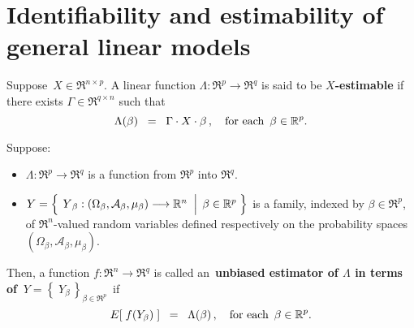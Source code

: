 

\section{Identifiability and estimability of general linear models}
\setcounter{theorem}{0}
\setcounter{equation}{0}

\renewcommand{\theenumi}{\roman{enumi}}
\renewcommand{\labelenumi}{\textnormal{(\theenumi)}$\;\;$}


\begin{definition}
\mbox{}\vskip 0.1cm\noindent
Suppose \,$X \in \Re^{n \times p}$.
A linear function $\Lambda : \Re^{p} \longrightarrow \Re^{q}$ is said to be \textbf{$X$-estimable}
if there exists $\Gamma \in \Re^{q \times n}$ such that
\begin{equation*}
\Lambda(\beta) \;\; =\;\; \Gamma \cdot X \cdot \beta\,,
\quad
\textnormal{for each \,$\beta \in \Re^{p}$}.
\end{equation*}
\end{definition}

\begin{definition}
\mbox{}\vskip 0.1cm\noindent
Suppose:
\begin{itemize}
\item
	$\Lambda : \Re^{p} \longrightarrow \Re^{q}$ is a function from $\Re^{p}$ into $\Re^{q}$.
\item
	$Y = \left\{\;
		\left.
		\overset{{\color{white}.}}{Y}_{\beta} : (\Omega_{\beta},\mathcal{A}_{\beta},\mu_{\beta}) \longrightarrow \Re^{n}
		\;\;\right\vert\;
		\beta \in \Re^{p}
		\;\right\}$
	is a family, indexed by $\beta \in \Re^{p}$,
	of $\Re^{n}$-valued random variables defined respectively on the
	probability spaces $(\Omega_{\beta},\mathcal{A}_{\beta},\mu_{\beta})$.
\end{itemize}
Then,
a function $f : \Re^{n} \longrightarrow \Re^{q}$ is called an
\,{\color{red}\textbf{unbiased estimator of $\Lambda$ in terms of \,$Y = \left\{\;Y_{\beta}\,\right\}_{\beta\in\Re^{p}}$}}\,
if
\begin{equation*}
E\!\left[\;f(Y_{\beta})\;\right] \;\; =\;\; \Lambda(\beta)\,,
\quad
\textnormal{for each \,$\beta \in \Re^{p}$}.
\end{equation*}
\end{definition}


